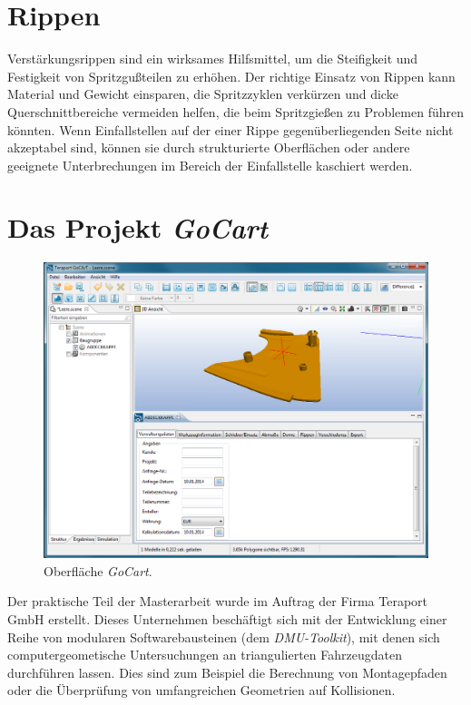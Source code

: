 \section{Rippen}
\label{rips}
 
Verst\"arkungsrippen sind ein wirksames Hilfsmittel, um die Steifigkeit und Festigkeit von Spritzgu{\ss}teilen zu erhöhen. Der richtige Einsatz von Rippen kann Material und Gewicht einsparen, die Spritzzyklen verkürzen und dicke Querschnittbereiche vermeiden helfen, die beim Spritzgie{\ss}en zu Problemen führen könnten. Wenn Einfallstellen auf der einer Rippe gegen\"uberliegenden Seite nicht akzeptabel sind, k\"onnen sie durch strukturierte Oberflächen oder andere geeignete Unterbrechungen im Bereich der Einfallstelle kaschiert werden.  

\section{Das Projekt \textit{GoCart}}
\label{goCart}

\begin{figure}[H]
\centerline{
	\includegraphics[width=0.95\columnwidth]{graphics/goCart.png}
}
\caption{Oberfl\"ache \textit{GoCart}.}
\label{im:goCart}
\end{figure}

Der praktische Teil der Masterarbeit wurde im Auftrag der Firma Teraport GmbH erstellt. Dieses Unternehmen besch\"aftigt sich mit der Entwicklung einer Reihe von modularen Softwarebausteinen (dem \textit{DMU-Toolkit}), mit denen sich computergeometische Untersuchungen an triangulierten Fahrzeugdaten durchf\"uhren lassen. Dies sind zum Beispiel die Berechnung von Montagepfaden oder die \"Uberpr\"ufung von umfangreichen Geometrien auf Kollisionen. 

